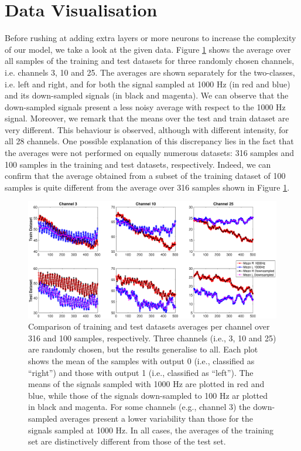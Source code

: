 \documentclass{article}
\begin{document}
 \section{Data Visualisation}\label{sec_visual}
 Before rushing at adding extra layers or more neurons to increase the complexity of our model, we  take a look at the given data. 
 Figure \ref{fig_mean_1000hz_vs_downsampled} shows the average over all samples of the training and test datasets for three randomly chosen channels, i.e. channels 3, 10 and 25. 
The averages are shown separately for the two-classes, i.e. left and right, and for both the signal sampled at 1000 Hz (in red and blue) and its down-sampled signals (in black and magenta). 
We can observe that the down-sampled signals present a less noisy average with respect to the 1000 Hz signal. 
Moreover, we remark that  the means over the test and train dataset are very different. 
This behaviour is observed, although with different intensity, for all 28 channels. 
One possible explanation of this discrepancy lies in the fact that the averages were not performed on equally numerous datasets: 316 samples and 100 samples in the training and test datasets, respectively. 
Indeed, we can confirm that the average obtained from a subset of the training dataset of 100 samples is quite different from the average over 316 samples shown in Figure \ref{fig_mean_1000hz_vs_downsampled}. 
%
 \begin{figure}[h]
 \begin{center}
  \includegraphics[width=1\textwidth]{fig/fig4new_mean_downsampled_vs1000} 
  \caption{Comparison of training and test datasets averages per channel over 316 and 100 samples, respectively.  
  Three channels (i.e., 3, 10 and 25) are randomly chosen, but the results generalise to all. 
  Each plot shows the mean of the samples with output 0 (i.e., classified as ``right'') and those with output 1 (i.e., classified as ``left''). 
  The means of the signals sampled with 1000 Hz are plotted in red and blue, while those of the signals down-sampled to 100 Hz ar plotted in black and magenta. 
For some channels (e.g., channel 3) the down-sampled averages present a lower variability than those for the signals sampled at 1000 Hz. 
  In all cases, the averages of the training set are distinctively different from those of the test set. 
  \label{fig_mean_1000hz_vs_downsampled}}
  \end{center}
  \end{figure}
\end{document}
